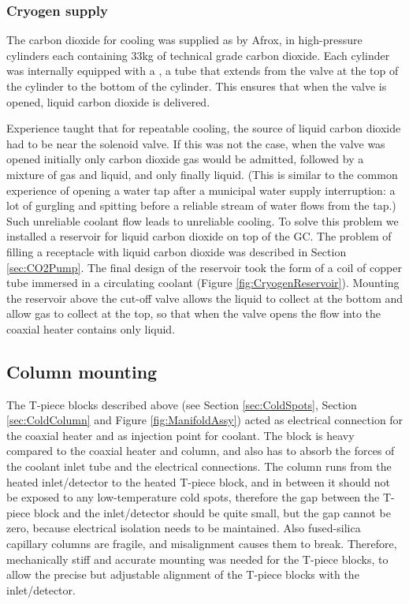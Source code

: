 \subsubsection{Cryogen supply}

The carbon dioxide for cooling was supplied as by Afrox, in high-pressure
cylinders each containing 33kg of technical grade carbon dioxide. Each cylinder
was internally equipped with a , a tube that extends from the
valve at the top of the cylinder to the bottom of the cylinder. This ensures
that when the valve is opened, liquid carbon dioxide is delivered.

Experience taught that for repeatable cooling, the source of liquid carbon
dioxide had to be near the solenoid valve. If this was not the case, when the
valve was opened initially only carbon dioxide gas would be admitted, followed
by a mixture of gas and liquid, and only finally liquid. (This is similar to the
common experience of opening a water tap after a municipal water supply
interruption: a lot of gurgling and spitting before a reliable stream of water
flows from the tap.) Such unreliable coolant flow leads to unreliable cooling.
To solve this problem we installed a reservoir for liquid carbon dioxide on top
of the GC. The problem of filling a receptacle with liquid carbon dioxide was
described in Section \ref{sec:CO2Pump}. The final design of the reservoir took
the form of a coil of copper tube immersed in a circulating coolant (Figure
\ref{fig:CryogenReservoir}). Mounting the reservoir above the cut-off valve
allows the liquid to collect at the bottom and allow gas to collect at the top,
so that when the valve opens the flow into the coaxial heater contains only
liquid.

\subsection{Column mounting}

The T-piece blocks described above (see Section \ref{sec:ColdSpots}, Section
\ref{sec:ColdColumn} and Figure \ref{fig:ManifoldAssy}) acted as electrical
connection for the coaxial heater and as injection point for coolant. The block
is heavy compared to the coaxial heater and column, and also has to absorb the
forces of the coolant inlet tube and the electrical connections. The column runs
from the heated inlet/detector to the heated T-piece block, and in between it
should not be exposed to any low-temperature cold spots, therefore the gap
between the T-piece block and the inlet/detector should be quite small, but the
gap cannot be zero, because electrical isolation needs to be maintained.
Also fused-silica capillary columns are fragile, and misalignment causes them to
break. Therefore, mechanically stiff and accurate mounting was needed for the
T-piece blocks, to allow the precise but adjustable alignment of the T-piece
blocks with the inlet/detector.

